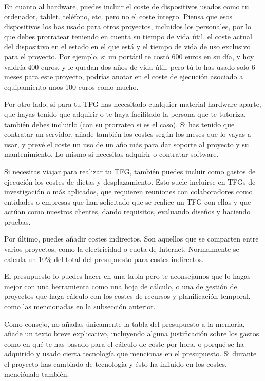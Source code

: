 En cuanto al hardware, puedes incluir el coste de dispositivos usados como tu ordenador, tablet, teléfono, etc. pero no el coste íntegro. Piensa que esos dispositivos los has usado para otros proyectos, incluidos los personales, por lo que debes prorratear teniendo en cuenta su tiempo de vida útil, el coste actual del dispositivo en el estado en el que está y el tiempo de vida de uso exclusivo para el proyecto. Por ejemplo, si un portátil te costó 600 euros en su día, y hoy valdría 400 euros, y le quedan dos años de vida útil, pero tú lo has usado solo 6 meses para este proyecto, podrías anotar en el coste de ejecución asociado a equipamiento unos 100 euros como mucho.  

Por otro lado, si para tu TFG has necesitado cualquier material hardware aparte, que hayas tenido que adquirir o te haya facilitado la persona que te tutoriza, también debes incluirlo (con su prorrateo si es el caso). Si has tenido que contratar un servidor, añade también los costes según los meses que lo vayas a usar, y prevé el coste un uso de un año más para dar soporte al proyecto y su mantenimiento. Lo mismo si necesitas adquirir o contratar software.

Si necesitas viajar para realizar tu TFG, también puedes incluir como gastos de ejecución los costes de dietas y desplazamiento. Esto suele incluirse en TFGs de investigación o más aplicados, que requieren reuniones con colaboradores como entidades o empresas que han solicitado que se realice un TFG con ellas y que actúan como nuestros clientes, dando requisitos, evaluando diseños y haciendo pruebas. 

Por último, puedes añadir costes indirectos. Son aquellos que se comparten entre varios proyectos, como la electricidad o cuota de Internet. Normalmente se calcula un 10\% del total del presupuesto para costes indirectos.

El presupuesto lo puedes hacer en una tabla pero te aconsejamos que lo hagas mejor con una herramienta como una hoja de cálculo, o una de gestión de proyectos que haga cálculo con los costes de recursos y planificación temporal, como las mencionadas en la subsección anterior.

Como consejo, no añadas únicamente la tabla del presupuesto a la memoria, añade un texto breve explicativo, incluyendo alguna justificación sobre los gastos como en qué te has basado para el cálculo de coste por hora, o porqué se ha adquirido y usado cierta tecnología que mencionas en el presupuesto. Si durante el proyecto has cambiado de tecnología y ésto ha influido en los costes, menciónalo también.

